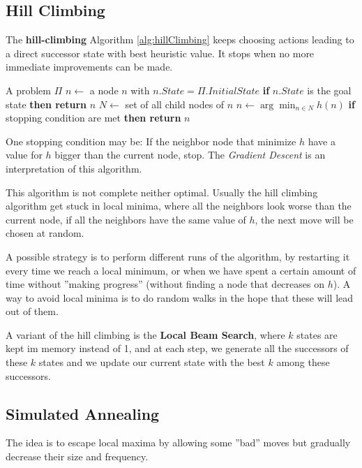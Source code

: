 \documentclass[10pt, letterpaper]{report}
\begin{document}
\subsection{Hill Climbing}
The \textbf{hill-climbing} Algorithm \ref{alg:hillClimbing} keeps  choosing actions leading to a direct successor
 state with best heuristic value. It stops when no more immediate
 improvements can be made.

 \begin{algorithm}
    \caption{Hill-Climbing}\label{alg:hillClimbing}
    \begin{algorithmic}
    \Require A problem $\Pi$
    \State $n\leftarrow$ a node $n$ with $n.State=\Pi.InitialState$
    \State\textbf{if} $n.State$ is the goal state \textbf{then return} $n$ 
    \State $N\leftarrow$ set of all child nodes of $n$
    \State $n\leftarrow \arg\min_{n\in N} h(n)$
    \State\textbf{if} stopping condition are met \textbf{then return} $n$ 
    \EndWhile
    \end{algorithmic}
\end{algorithm}
One stopping condition may be: If the neighbor node that minimize $h$ have a value for $h$ bigger than the current node, stop. 
The \textit{Gradient Descent} is an interpretation of this algorithm.


This algorithm is not complete neither optimal. Usually the hill climbing algorithm get stuck in local minima, where all the neighbors look worse than the current node, if all the neighbors have the same value of $h$, the next move will be chosen at random.\bigskip

A possible strategy is to perform different runs of the algorithm, by restarting it every time we reach a local minimum, or when we have spent a certain amount of time without ''making progress'' (without finding a node that decreases on $h$). A way to avoid local minima is to do random walks in the hope that these will lead out of them.\bigskip 

A variant of the hill climbing is the \textbf{Local Beam Search},  where $k$ states are kept im memory instead of 1, and at each step, we generate all the successors of these $k$ states and we update our current state with the best $k$ among these successors.
\subsection{Simulated Annealing}
The idea is to escape local maxima by allowing some ''bad'' moves but gradually decrease their size and frequency.\bigskip 
\end{document}
